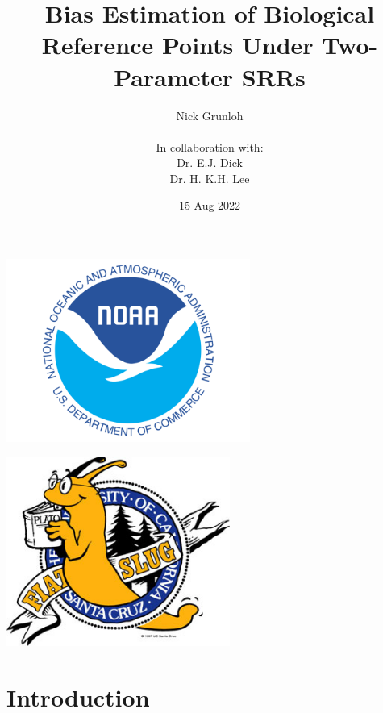 \documentclass[ xcolor = pdftex, dvipsnames, table ]{beamer}
\title{Bias Estimation of Biological Reference Points Under Two-Parameter SRRs}
\author{
Nick Grunloh\\$~$\\
In collaboration with:\\
Dr. E.J. Dick\\
Dr. H. K.H. Lee
}
\date{15 Aug 2022}
\begin{document}
%
\begin{frame}
\titlepage
\vspace*{-3cm}
\begin{minipage}[h!]{0.49\textwidth}
\hspace*{-0.25cm}
\includegraphics[width=0.6\textwidth]{noaaText.png}
\end{minipage}
\begin{minipage}[h!]{0.49\textwidth}
\hspace*{2cm}
\includegraphics[width=0.55\textwidth]{slug.jpg}
\end{minipage}
\end{frame}

%
\section{Introduction}
\subsection{}
\end{document}
